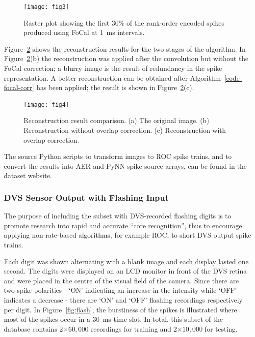 \documentclass{frontiersENG} %
\begin{document}
\begin{figure}[hbt]
	\centering
	\texttt{[image: fig3]}
	\caption{Raster plot showing the first 30\% of the rank-order encoded spikes produced using FoCal at 1~ms intervals.}
	\label{fig-raster-plot-30pc}
\end{figure}

Figure~\ref{fig-reconstruction-results} shows the reconstruction results for the two stages of the algorithm. In Figure~\ref{fig-reconstruction-results}(b) the reconstruction was applied after the convolution but without the FoCal correction; a blurry image is the result of redundancy in the spike representation. A better reconstruction can be obtained after Algorithm~\ref{code-focal-corr} has been applied; the result is shown in Figure~\ref{fig-reconstruction-results}(c).


\begin{figure}[hbt]
	\centering
	\texttt{[image: fig4]}
	\caption{Reconstruction result comparison. (a) The original image. (b) Reconstruction without overlap correction. (c) Reconstruction with overlap correction.}
	\label{fig-reconstruction-results}
\end{figure}

The source Python scripts to transform images to ROC spike trains, and to convert the results into AER and PyNN spike source arrays, can be found in the dataset website.

\subsubsection{DVS Sensor Output with Flashing Input}
\label{subsec_flash}
The purpose of including the subset with DVS-recorded flashing digits is to promote research into rapid and accurate ``core recognition'', thus to encourage applying non-rate-based algorithms, for example ROC, to short DVS output spike trains.

Each digit was shown alternating with a blank image and each display lasted one second.
The digits were displayed on an LCD monitor in front of the DVS retina~\citep{serrano2013128} and were placed in the centre of the visual field of the camera.
Since there are two spike polarities - `ON' indicating an increase in the intensity while `OFF' indicates a decrease - there are `ON' and `OFF' flashing recordings respectively per digit.
In Figure~\ref{fig:flash}, the burstiness of the spikes is illustrated where most of the spikes occur in a 30~ms time slot. 
In total, this subset of the database contains 2$\times$$60,000$ recordings for training and 2$\times$$10,000$ for testing.
\end{document}
